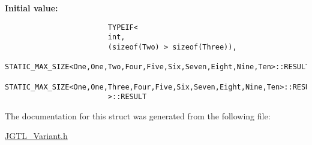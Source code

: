 \textbf{Initial value:}

\begin{Code}\begin{verbatim}
                        TYPEIF<
                        int,
                        (sizeof(Two) > sizeof(Three)),
                        STATIC_MAX_SIZE<One,One,Two,Four,Five,Six,Seven,Eight,Nine,Ten>::RESULT,
                        STATIC_MAX_SIZE<One,One,Three,Four,Five,Six,Seven,Eight,Nine,Ten>::RESULT
                        >::RESULT
\end{verbatim}\end{Code}


The documentation for this struct was generated from the following file:\begin{CompactItemize}
\item 
\hyperlink{_j_g_t_l___variant_8h}{JGTL\_\-Variant.h}\end{CompactItemize}

